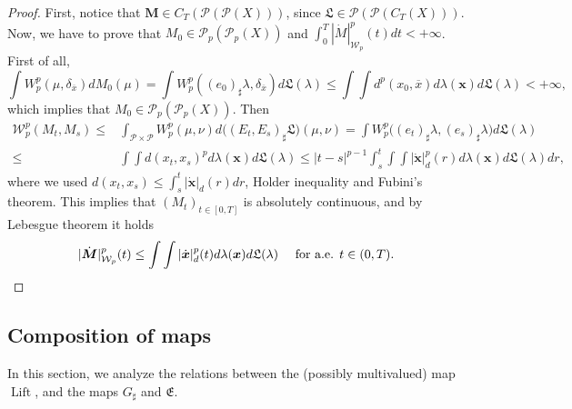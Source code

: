 \documentclass[10pt,leqno]{amsart}
\numberwithin{equation}{section}
\newcommand{\PP}{\mathcal{P}}
\begin{document}
\begin{proof}
    First, notice that $\boldsymbol{M} \in C_T(\PP(\PP(X)))$, since $\mathfrak{L} \in \PP(\PP(C_T(X)))$. Now, we have to prove that $M_0 \in \PP_p(\PP_p(X))$ and $\int_0^T|\dot{M}|_{\mathcal{W}_p}^p(t) dt <+\infty$.
    First of all,
    \[
    \int W_{p}^p(\mu,\delta_{\overline{x}}) dM_0(\mu) =\int W_{p}^p((e_0)_\sharp \lambda, \delta_{\overline{x}}) d\mathfrak{L}(\lambda)  \leq 
    \int \int d^p(x_0,\overline{x}) d\lambda(\boldsymbol{x}) d\mathfrak{L}(\lambda) <+\infty, 
    \]
    which implies that $M_0 \in \PP_p(\PP_p(X))$. Then
    \begin{align*}
        \mathcal{W}_p^p(M_t,M_s) \leq & \int_{\PP\times\PP} W_{p}^p(\mu,\nu) d\big((E_t,E_s)_\sharp \mathfrak{L}\big)(\mu,\nu) 
        =  \int W_{p}^p\big((e_t)_\sharp \lambda, (e_s)_\sharp \lambda\big) d\mathfrak{L}(\lambda)
        \\
        \leq &
        \int \int d(x_t,x_s)^pd\lambda(\boldsymbol{x})d\mathfrak{L}(\lambda) 
        \leq 
        |t-s|^{p-1} \int_s^t \int \int |\dot{\boldsymbol{x}}|^p_d(r) d\lambda(\boldsymbol{x}) d\mathfrak{L}(\lambda) dr,
    \end{align*}
    where we used $d(x_t, x_s) \leq \int_s^t|\dot{\boldsymbol{x}}|_d(r) dr$, Holder inequality and Fubini's theorem.
    This implies that $(M_t)_{t\in[0,T]}$ is absolutely continuous, and by Lebesgue theorem it holds
    \[|\dot{\boldsymbol{M}}|_{\mathcal{W}_p}^p(t)\leq \int\int |\dot{\boldsymbol{x}}|_{d}^p(t) d\lambda(\boldsymbol{x}) d\mathfrak{L}(\lambda)\quad \text{ for a.e. }t\in(0,T).\qedhere\]
\end{proof}




\subsection{Composition of maps}\label{comp of maps}
In this section, we analyze the relations between the (possibly multivalued) map $\operatorname{Lift}$, and the maps $G_\sharp $ and $\mathfrak{E}$.
\end{document}

